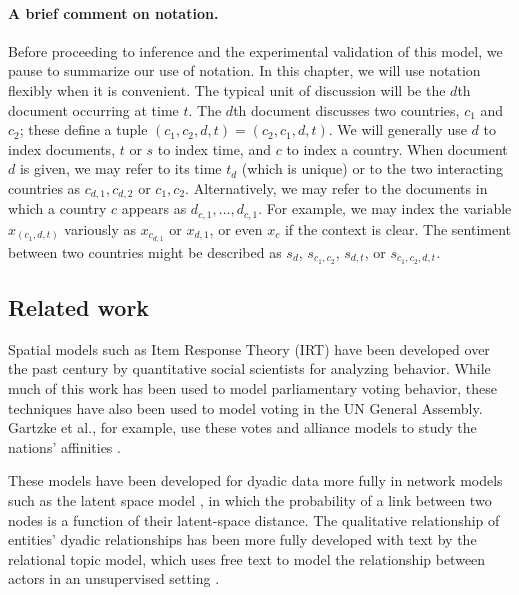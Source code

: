 \paragraph{A brief comment on notation.} Before proceeding to
inference and the experimental validation of this model, we pause to
summarize our use of notation.  In this chapter, we will use notation
flexibly when it is convenient.  The typical unit of discussion will
be the $d$th document occurring at time $t$.  The $d$th document
discusses two countries, $c_1$ and $c_2$; these define a tuple $(c_1,
c_2, d, t) = (c_2, c_1, d, t)$.  We will generally use $d$ to index
documents, $t$ or $s$ to index time, and $c$ to index a country.  When
document $d$ is given, we may refer to its time $t_d$ (which is
unique) or to the two interacting countries as $c_{d,1},c_{d,2}$ or
$c_1,c_2$.  Alternatively, we may refer to the documents in which a
country $c$ appears as $d_{c,1}, \ldots, d_{c,1}$.
For example, we may index the variable $x_{(c_1,d,t)}$ variously as
$x_{c_{d,1}}$ or $x_{d,1}$, or even $x_c$ if the context is clear. The
sentiment between two countries might be described as $s_d$,
$s_{c_1,c_2}$, $s_{d,t}$, or $s_{c_1,c_2,d,t}$.

\subsection{Related work}

Spatial models such as Item Response Theory (IRT) have been developed
over the past century by quantitative social scientists for analyzing
behavior.  While much of this work has been used to model
parliamentary voting behavior, these techniques have also been used to
model voting in the UN General Assembly. Gartzke et al., for example,
use these votes and alliance models to study the nations' affinities
\cite{gartzke:1998}.

These models have been developed for dyadic data more fully in network
models such as the latent space model \cite{hoff:2002,sarkar:2005}, in
which the probability of a link between two nodes is a function of
their latent-space distance.  The qualitative relationship of
entities' dyadic relationships has been more fully developed with text
by the relational topic model, which uses free text to model the
relationship between actors in an unsupervised setting
\cite{chang:2009}.


